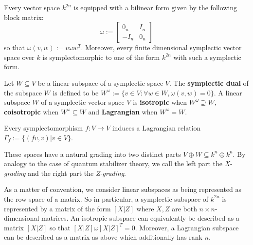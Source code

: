 \begin{lemma}
\label{lemma:sform}
Every vector space $k^{2n}$ is equipped with a bilinear form given by the following block matrix:
$$
\omega:=
\begin{bmatrix}
0_n & I_n\\
-I_n & 0_n
\end{bmatrix}
$$
so that $\omega(v,w) := v \omega w^T$.
Moreover, every finite dimensional symplectic vector space over $k$ is symplectomorphic to one of the form $k^{2n}$ with such a symplectic form.
\end{lemma}



%
%
%

\begin{definition}

Let $W \subseteq V$ be a linear subspace of a symplectic space $V$.
The {\bf symplectic dual} of the subspace $W$ is defined to be
$
W^\omega:= \{v \in V : \forall w \in W, \omega(v,w)=0 \}
$.
A linear subspace  $W$ of a symplectic vector space $V$ is {\bf isotropic} when $W^\omega \supseteq W$, {\bf coisotropic} when $W^\omega \subseteq W$ and {\bf Lagrangian} when $W^\omega=W$.


\end{definition}

\begin{lemma}
Every symplectomorphism $f:V\to V$ induces a Lagrangian relation $\Gamma_f:=\{ (fv, v) | v \in V \}$.
\end{lemma}

These spaces have a natural grading into two distinct parts $V \oplus W \subseteq k^n \oplus k^n$. By analogy to the case of quantum stabilizer theory, we call the left part the \textit{X-grading} and the right part the \textit{Z-grading}.

As a matter of convention, we consider linear subspaces as being represented as the row space of a matrix. So in particular, a symplectic subspace of $k^{2n}$ is represented by a matrix of the form $[X|Z]$ where $X,Z$ are both $n\times n$-dimensional matrices.
An isotropic subspace can equivalently be described as a matrix $[X|Z]$ so that $[X|Z] \omega [X|Z]^T = 0$.
Moreover, a Lagrangian subspace can be described as a matrix as above which additionally has rank $n$.


